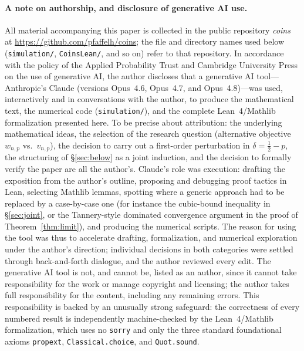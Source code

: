 \documentclass[12pt]{article}
\theoremstyle{definition}
\theoremstyle{remark}
\begin{document}
\paragraph{A note on authorship, and disclosure of generative AI use.}
All material accompanying this paper is collected in the public
repository \emph{coins} at \url{https://github.com/pfaffelh/coins};
the file and directory names used below
(\texttt{simulation/}, \texttt{CoinsLean/}, and so on) refer to that
repository.
In accordance with the policy of the Applied Probability Trust and
Cambridge University Press on the use of generative AI, the author
discloses that
a generative AI tool---Anthropic's Claude (versions Opus~4.6,
Opus~4.7, and Opus~4.8)---was used, interactively and in conversations
with the author, to produce the mathematical text, the numerical code
(\texttt{simulation/}), and the complete Lean~4/Mathlib formalization
presented here.  To be precise about attribution: the underlying
mathematical ideas, the selection of the research question
(alternative objective $w_{n,p}$ vs.\ $v_{n,p}$), the decision to
carry out a first-order perturbation in $\delta=\tfrac12-p$, the
structuring of \S\ref{sec:below} as a joint induction, and the
decision to formally verify the paper are all the author's.
Claude's role was execution: drafting the exposition from the
author's outline, proposing and debugging proof tactics in Lean,
selecting Mathlib lemmas, spotting where a generic approach had to
be replaced by a case-by-case one (for instance the cubic-bound
inequality in \S\ref{sec:joint}, or the Tannery-style dominated
convergence argument in the proof of Theorem~\ref{thm:limit}), and
producing the numerical scripts.  The reason for using the tool was
thus to accelerate drafting, formalization, and numerical exploration
under the author's direction; individual decisions in both categories
were settled through back-and-forth dialogue, and the author reviewed
every edit.  The generative AI tool is not, and cannot be, listed as
an author, since it cannot take responsibility for the work or manage
copyright and licensing; the author takes full responsibility for the
content, including any remaining errors.  This responsibility is
backed by an unusually strong safeguard: the correctness of every
numbered result is independently machine-checked by the
Lean~4/Mathlib formalization, which uses no \texttt{sorry} and only
the three standard foundational axioms \texttt{propext},
\texttt{Classical.choice}, and \texttt{Quot.sound}.
\end{document}
